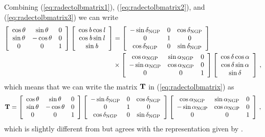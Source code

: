 Combining (\ref{eq:radectolbmatrix1}), (\ref{eq:radectolbmatrix2}), and (\ref{eq:radectolbmatrix3}) we can write
\begin{equation}
\begin{split}
\left[ \begin{array}{ccc} \cos \theta & \sin \theta & 0\\\sin \theta & -\cos \theta & 0\\0&0&1 \end{array} \right]
\left[ \begin{array}{c} \cos {\it b} \cos {\it l} \\ \cos {\it b} \sin {\it l} \\ \sin {\it b} \end{array} \right] & = 
\left[ \begin{array}{ccc} -\sin \delta_{\textnormal{NGP}} & 0 & \cos \delta_{\textnormal{NGP}}\\ 0 & 1 & 0 \\ \cos \delta_{\textnormal{NGP}} & 0 & \sin \delta_{\textnormal{NGP}}\end{array} \right] \\
& \times \left[ \begin{array}{ccc} \cos \alpha_{\textnormal{NGP}} &\sin\alpha_{\textnormal{NGP}}&0\\ -\sin\alpha_{\textnormal{NGP}} & \cos\alpha_{\textnormal{NGP}}&0\\ 0&0&1\end{array} \right]
\left[ \begin{array}{c} \cos \delta \cos \alpha \\ \cos \delta \sin \alpha \\ \sin \delta \end{array} \right]\, ,
\end{split}
\end{equation}
which means that we can write the matrix $\mathbf{T}$ in (\ref{eq:radectolbmatrix}) as
\begin{equation}\label{eq:radectolbT}
\mathbf{T} = \left[ \begin{array}{ccc} \cos \theta & \sin \theta & 0\\\sin \theta & -\cos \theta & 0\\0&0&1 \end{array} \right]
\left[ \begin{array}{ccc} -\sin \delta_{\textnormal{NGP}} & 0 & \cos \delta_{\textnormal{NGP}}\\ 0 & 1 & 0 \\ \cos \delta_{\textnormal{NGP}} & 0 & \sin \delta_{\textnormal{NGP}}\end{array} \right]
\left[ \begin{array}{ccc} \cos \alpha_{\textnormal{NGP}} &\sin\alpha_{\textnormal{NGP}}&0\\ -\sin\alpha_{\textnormal{NGP}} & \cos\alpha_{\textnormal{NGP}}&0\\ 0&0&1\end{array} \right]\, ,
\end{equation}
which is slightly different from but agrees with the representation
given by \citet{1987AJ.....93..864J}.

